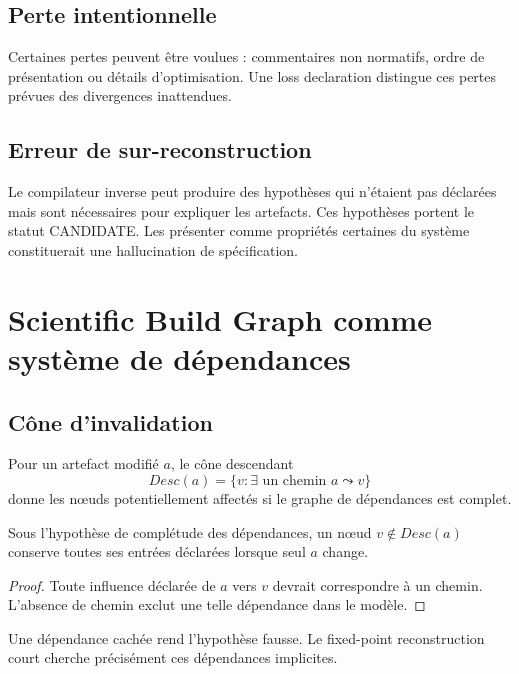 \section{Perte intentionnelle}

Certaines pertes peuvent être voulues : commentaires non normatifs, ordre de présentation ou détails d'optimisation. Une loss declaration distingue ces pertes prévues des divergences inattendues.

\section{Erreur de sur-reconstruction}

Le compilateur inverse peut produire des hypothèses qui n'étaient pas déclarées mais sont nécessaires pour expliquer les artefacts. Ces hypothèses portent le statut CANDIDATE. Les présenter comme propriétés certaines du système constituerait une hallucination de spécification.

\chapter{Scientific Build Graph comme système de dépendances}

\section{Cône d'invalidation}

Pour un artefact modifié $a$, le cône descendant
\[
Desc(a)=\{v:\exists\text{ un chemin }a\leadsto v\}
\]
donne les nœuds potentiellement affectés si le graphe de dépendances est complet.

\begin{proposition}
Sous l'hypothèse de complétude des dépendances, un nœud $v\notin Desc(a)$ conserve toutes ses entrées déclarées lorsque seul $a$ change.
\end{proposition}

\begin{proof}
Toute influence déclarée de $a$ vers $v$ devrait correspondre à un chemin. L'absence de chemin exclut une telle dépendance dans le modèle.
\end{proof}

\begin{limitation}
Une dépendance cachée rend l'hypothèse fausse. Le fixed-point reconstruction court cherche précisément ces dépendances implicites.
\end{limitation}


